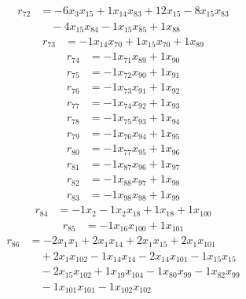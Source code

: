 \[\begin{aligned}
r_{72} &= - 6 x_{3} x_{15} + 1 x_{14} x_{83} + 12 x_{15} - 8 x_{15} x_{83} \\
 &\quad - 4 x_{15} x_{84} - 1 x_{15} x_{85} + 1 x_{88}
\end{aligned}\]
\[\begin{aligned}
r_{73} &= - 1 x_{14} x_{70} + 1 x_{15} x_{70} + 1 x_{89}
\end{aligned}\]
\[\begin{aligned}
r_{74} &= - 1 x_{71} x_{89} + 1 x_{90}
\end{aligned}\]
\[\begin{aligned}
r_{75} &= - 1 x_{72} x_{90} + 1 x_{91}
\end{aligned}\]
\[\begin{aligned}
r_{76} &= - 1 x_{73} x_{91} + 1 x_{92}
\end{aligned}\]
\[\begin{aligned}
r_{77} &= - 1 x_{74} x_{92} + 1 x_{93}
\end{aligned}\]
\[\begin{aligned}
r_{78} &= - 1 x_{75} x_{93} + 1 x_{94}
\end{aligned}\]
\[\begin{aligned}
r_{79} &= - 1 x_{76} x_{94} + 1 x_{95}
\end{aligned}\]
\[\begin{aligned}
r_{80} &= - 1 x_{77} x_{95} + 1 x_{96}
\end{aligned}\]
\[\begin{aligned}
r_{81} &= - 1 x_{87} x_{96} + 1 x_{97}
\end{aligned}\]
\[\begin{aligned}
r_{82} &= - 1 x_{88} x_{97} + 1 x_{98}
\end{aligned}\]
\[\begin{aligned}
r_{83} &= - 1 x_{98} x_{98} + 1 x_{99}
\end{aligned}\]
\[\begin{aligned}
r_{84} &= - 1 x_{2} - 1 x_{2} x_{18} + 1 x_{18} + 1 x_{100}
\end{aligned}\]
\[\begin{aligned}
r_{85} &= - 1 x_{16} x_{100} + 1 x_{101}
\end{aligned}\]
\[\begin{aligned}
r_{86} &= - 2 x_{1} x_{1} + 2 x_{1} x_{14} + 2 x_{1} x_{15} + 2 x_{1} x_{101} \\
 &\quad + 2 x_{1} x_{102} - 1 x_{14} x_{14} - 2 x_{14} x_{101} - 1 x_{15} x_{15} \\
 &\quad - 2 x_{15} x_{102} + 1 x_{19} x_{104} - 1 x_{80} x_{99} - 1 x_{82} x_{99} \\
 &\quad - 1 x_{101} x_{101} - 1 x_{102} x_{102}
\end{aligned}\]
